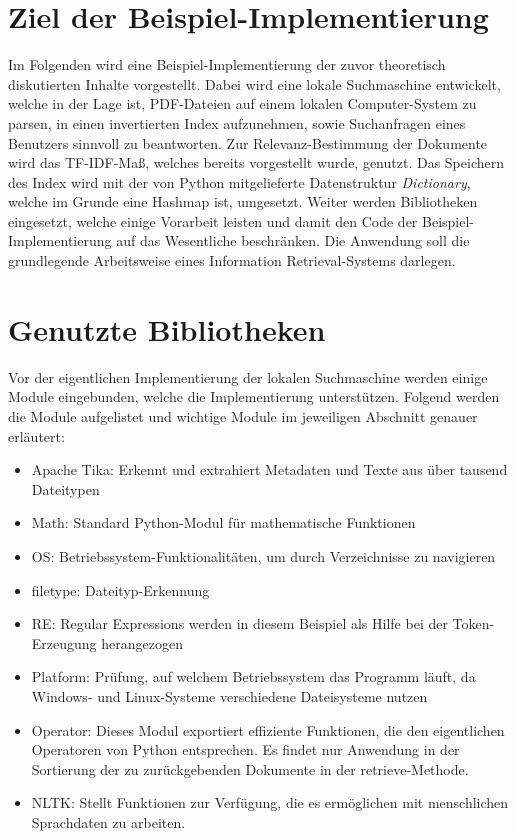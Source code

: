 \section{Ziel der Beispiel-Implementierung}\label{ziel-der-beispiel-implementierung}

Im Folgenden wird eine Beispiel-Implementierung der zuvor theoretisch diskutierten Inhalte vorgestellt. Dabei wird eine lokale Suchmaschine entwickelt, welche in der Lage ist, PDF-Dateien auf einem lokalen Computer-System zu parsen, in einen invertierten Index aufzunehmen, sowie Suchanfragen eines Benutzers sinnvoll zu beantworten. Zur Relevanz-Bestimmung der Dokumente wird das TF-IDF-Maß, welches bereits vorgestellt wurde, genutzt. Das Speichern des Index wird mit der von Python mitgelieferte Datenstruktur \textit{Dictionary}, welche im Grunde eine Hashmap ist, umgesetzt. Weiter werden Bibliotheken eingesetzt, welche einige Vorarbeit leisten und damit den Code der Beispiel-Implementierung auf das Wesentliche beschränken. Die Anwendung soll die grundlegende Arbeitsweise eines Information Retrieval-Systems darlegen.

\section{Genutzte Bibliotheken}\label{genutzte-bibliotheken}

Vor der eigentlichen Implementierung der lokalen Suchmaschine werden einige Module eingebunden, welche die Implementierung unterstützen. Folgend werden die Module aufgelistet und wichtige Module im jeweiligen Abschnitt genauer erläutert:
\begin{itemize}
	\item Apache Tika: Erkennt und extrahiert Metadaten und Texte aus über tausend Dateitypen
	\item Math: Standard Python-Modul für mathematische Funktionen
	\item OS: Betriebssystem-Funktionalitäten, um durch Verzeichnisse zu navigieren
	\item filetype: Dateityp-Erkennung
	\item RE: Regular Expressions werden in diesem Beispiel als Hilfe bei der Token-Erzeugung herangezogen
	\item Platform: Prüfung, auf welchem Betriebssystem das Programm läuft, da Windows- und Linux-Systeme verschiedene Dateisysteme nutzen
	\item Operator: Dieses Modul exportiert effiziente Funktionen, die den eigentlichen Operatoren von Python entsprechen. Es findet nur Anwendung in der Sortierung der zu zurückgebenden Dokumente in der retrieve-Methode.
	\item NLTK: Stellt Funktionen zur Verfügung, die es ermöglichen mit menschlichen Sprachdaten zu arbeiten.
\end{itemize}

